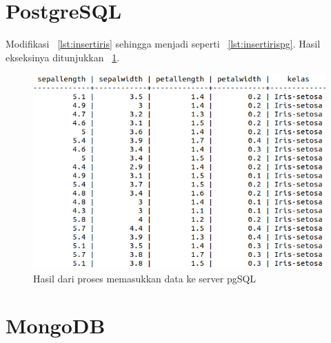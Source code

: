 \section{PostgreSQL}
Modifikasi \lstlistingname~\ref{lst:insertiris} sehingga menjadi seperti \lstlistingname~\ref{lst:insertirispg}. Hasil ekseksinya ditunjukkan \figurename~\ref{fig:insertpgsql}.



\begin{figure}
  \begin{center}
    \includegraphics[scale=2.0]{pics/insertpgsql.png}
    \caption{Hasil dari proses memasukkan data ke server pgSQL}
    \label{fig:insertpgsql}
  \end{center}
\end{figure}

\section{MongoDB}
